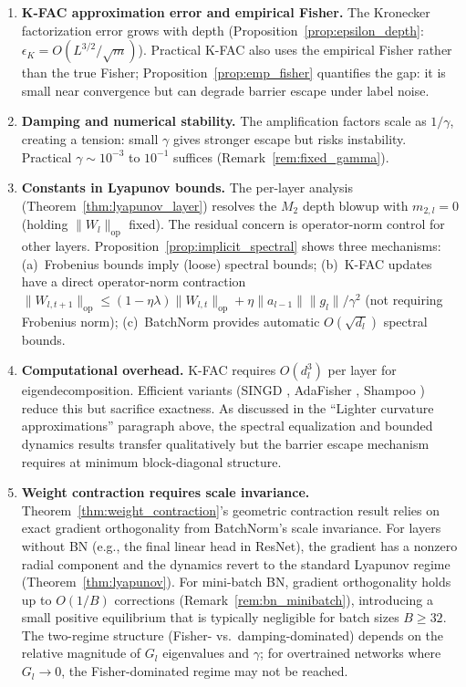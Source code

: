 \documentclass{article}
\providecommand{\norm}[1]{\lVert #1 \rVert}
\theoremstyle{plain}
\theoremstyle{definition}
\theoremstyle{remark}
\begin{document}
\begin{enumerate}
\item \textbf{K-FAC approximation error and empirical Fisher.} The Kronecker factorization error grows with depth (Proposition~\ref{prop:epsilon_depth}: $\epsilon_K = O(L^{3/2}/\sqrt{m})$). Practical K-FAC also uses the empirical Fisher rather than the true Fisher; Proposition~\ref{prop:emp_fisher} quantifies the gap: it is small near convergence but can degrade barrier escape under label noise.

\item \textbf{Damping and numerical stability.} The amplification factors scale as $1/\gamma$, creating a tension: small $\gamma$ gives stronger escape but risks instability. Practical $\gamma \sim 10^{-3}$ to $10^{-1}$ suffices (Remark~\ref{rem:fixed_gamma}).

\item \textbf{Constants in Lyapunov bounds.} The per-layer analysis (Theorem~\ref{thm:lyapunov_layer}) resolves the $M_2$ depth blowup with $m_{2,l} = 0$ (holding $\norm{W_l}_{\mathrm{op}}$ fixed). The residual concern is operator-norm control for other layers. Proposition~\ref{prop:implicit_spectral} shows three mechanisms: (a)~Frobenius bounds imply (loose) spectral bounds; (b)~K-FAC updates have a direct operator-norm contraction $\norm{W_{l,t+1}}_{\mathrm{op}} \leq (1-\eta\lambda)\norm{W_{l,t}}_{\mathrm{op}} + \eta\norm{a_{l-1}}\norm{g_l}/\gamma^2$ (not requiring Frobenius norm); (c)~BatchNorm provides automatic $O(\sqrt{d_l})$ spectral bounds.

\item \textbf{Computational overhead.} K-FAC requires $O(d_l^3)$ per layer for eigendecomposition. Efficient variants (SINGD \citep{lin2024singd}, AdaFisher \citep{adafisher2025}, Shampoo \citep{gupta2018shampoo}) reduce this but sacrifice exactness. As discussed in the ``Lighter curvature approximations'' paragraph above, the spectral equalization and bounded dynamics results transfer qualitatively but the barrier escape mechanism requires at minimum block-diagonal structure.

\item \textbf{Weight contraction requires scale invariance.} Theorem~\ref{thm:weight_contraction}'s geometric contraction result relies on exact gradient orthogonality from BatchNorm's scale invariance. For layers without BN (e.g., the final linear head in ResNet), the gradient has a nonzero radial component and the dynamics revert to the standard Lyapunov regime (Theorem~\ref{thm:lyapunov}). For mini-batch BN, gradient orthogonality holds up to $O(1/B)$ corrections (Remark~\ref{rem:bn_minibatch}), introducing a small positive equilibrium that is typically negligible for batch sizes $B \geq 32$. The two-regime structure (Fisher- vs.\ damping-dominated) depends on the relative magnitude of $G_l$ eigenvalues and $\gamma$; for overtrained networks where $G_l \to 0$, the Fisher-dominated regime may not be reached.


\end{enumerate}
\end{document}
